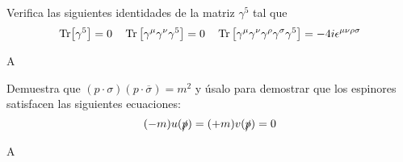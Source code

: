 \newpage


\begin{ejercicio} 
	Verifica las siguientes identidades de la matriz $\gamma^5$ tal que
	\begin{equation}
		\Tr [\gamma^5] = 0 \quad \Tr \left[ \gamma^\mu \gamma^\nu \gamma^5 \right] = 0 \quad \Tr \left[ \gamma^\mu \gamma^\nu \gamma^\rho \gamma^\sigma \gamma^5 \right]  = - 4 i \epsilon^{\mu \nu \rho \sigma}
	\end{equation}
\end{ejercicio}


\begin{solucion} 
	A
\end{solucion}



\begin{ejercicio} 
	Demuestra que $(p\cdot \sigma)(p\cdot \overline{\sigma}) = m^2$ y úsalo para demostrar que los espinores satisfacen las siguientes ecuaciones:
	\begin{equation}
		( - m ) u (\slashed{p}) = ( + m) v(\slashed{p}) = 0
	\end{equation}
\end{ejercicio}


\begin{solucion} 
	A
\end{solucion}


